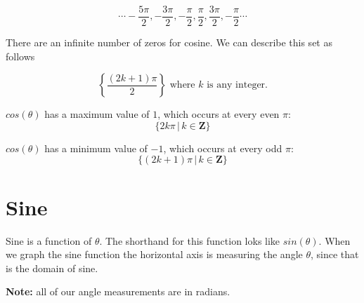 \documentclass{ximera}
\begin{document}
\[     \cdots -\frac{5\pi}{2},  -\frac{3\pi}{2},  -\frac{\pi}{2},  \frac{\pi}{2},  \frac{3\pi}{2},  -\frac{\pi}{2} \cdots \]


There are an infinite number of zeros for cosine.  We can describe this set as follows


\[  \left\{     \frac{(2k+1)\pi}{2}          \right\}    \text{ where }  k  \text{ is any integer.}     \]





$cos(\theta)$ has a maximum value of $1$, which occurs at every even $\pi$:  
\[ \{  2k\pi \, | \, k \in \textbf{Z}\} \]



$cos(\theta)$ has a minimum value of $-1$, which occurs at every odd $\pi$:  
\[ \{  (2k+1)\pi \, | \, k \in \textbf{Z}\} \]











\section{Sine}

Sine is a function of $\theta$. The shorthand for this function loks like $sin(\theta)$. When we graph the sine function the horizontal axis is measuring the angle $\theta$, since that is the domain of sine.

\textbf{Note:}  all of our angle measurements are in radians.





\begin{image}
\end{image}
\end{document}
